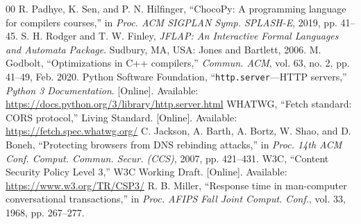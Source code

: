 \documentclass[conference]{IEEEtran}
\begin{document}
\begin{thebibliography}{00}
 R. Padhye, K. Sen, and P. N. Hilfinger, ``ChocoPy: A programming language for compilers courses,'' in \emph{Proc. ACM SIGPLAN Symp. SPLASH-E}, 2019, pp. 41--45.
 S. H. Rodger and T. W. Finley, \emph{JFLAP: An Interactive Formal Languages and Automata Package}. Sudbury, MA, USA: Jones and Bartlett, 2006.
 M. Godbolt, ``Optimizations in C++ compilers,'' \emph{Commun. ACM}, vol. 63, no. 2, pp. 41--49, Feb. 2020.
 Python Software Foundation, ``\texttt{http.server}---HTTP servers,'' \emph{Python 3 Documentation}. [Online]. Available: \url{https://docs.python.org/3/library/http.server.html}
 WHATWG, ``Fetch standard: CORS protocol,'' Living Standard. [Online]. Available: \url{https://fetch.spec.whatwg.org/}
 C. Jackson, A. Barth, A. Bortz, W. Shao, and D. Boneh, ``Protecting browsers from DNS rebinding attacks,'' in \emph{Proc. 14th ACM Conf. Comput. Commun. Secur. (CCS)}, 2007, pp. 421--431.
 W3C, ``Content Security Policy Level 3,'' W3C Working Draft. [Online]. Available: \url{https://www.w3.org/TR/CSP3/}
 R. B. Miller, ``Response time in man-computer conversational transactions,'' in \emph{Proc. AFIPS Fall Joint Comput. Conf.}, vol. 33, 1968, pp. 267--277.
\end{thebibliography}
\end{document}

